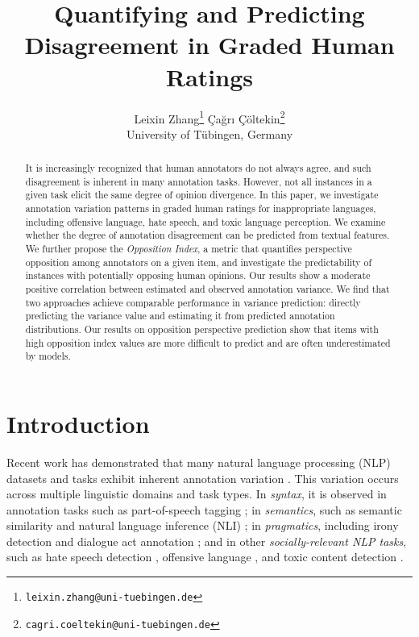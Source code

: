 \documentclass{article} %
\title{{\fontsize{13.5pt}{10pt}\selectfont
 Quantifying and Predicting Disagreement in Graded Human Ratings}}
\author{\hspace{0cm}Leixin Zhang\thanks{\texttt{leixin.zhang@uni-tuebingen.de}} \hspace{0.3cm} Çağrı Çöltekin\thanks{\texttt{cagri.coeltekin@uni-tuebingen.de}} 
\vspace{0.2cm}\\University of Tübingen, Germany
}
\begin{document}
\maketitle
\thispagestyle{plain}

\begin{abstract}
It is increasingly recognized that human annotators do not always agree, and such disagreement is inherent in many annotation tasks. However, not all instances in a given task elicit the same degree of opinion divergence. In this paper, we investigate annotation variation patterns in graded human ratings for inappropriate languages, including offensive language, hate speech, and toxic language perception. We examine whether the degree of annotation disagreement can be predicted from textual features. We further propose the \textit{Opposition Index}, a metric that quantifies perspective opposition among annotators on a given item, and investigate the predictability of instances with potentially opposing human opinions.
Our results show a moderate positive correlation between estimated and observed annotation variance. We find that two approaches achieve comparable performance in variance prediction: directly predicting the variance value and estimating it from predicted annotation distributions. Our results on opposition perspective prediction show that items with high opposition index values are more difficult to predict and are often underestimated by models.


\end{abstract}




\section{Introduction}





Recent work has demonstrated that many natural language processing (NLP) datasets and tasks exhibit inherent annotation variation \citep{plank-2022-problem, sorensen2024roadmap}. This variation occurs across multiple linguistic domains and task types. In \textit{{syntax}}, it is observed in annotation tasks such as part-of-speech tagging \citep{plank-etal-2014-learning, zeman2010hard}; in \textit{{semantics}}, such as semantic similarity \citep{wang2023collective} and natural language inference (NLI) \citep{huang2023culturally, jiang-marneffe-2022-investigating, pavlick2019inherent, liu2023we, zhang-de-marneffe-2021-identifying}; in \textit{{pragmatics}}, including irony detection \citep{casola-etal-2024-multipico} and dialogue act annotation \citep{verdonik2023annotating}; and in other \textit{{socially-relevant NLP tasks}}, such as hate speech detection \citep{sang2022origin, macavaney2019hate}, offensive language \citep{kocon2021offensive, davani2024d3code}, and toxic content detection \citep{kumar2021designing}.
\end{document}
